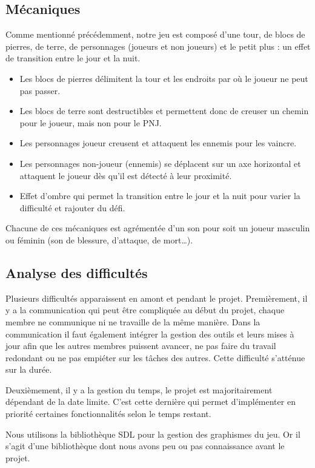 \documentclass[a4paper,12pt]{article}
\begin{document}
\subsection{Mécaniques}
Comme mentionné précédemment, notre jeu est composé d'une tour, de blocs de pierres, de terre, de personnages (joueurs et non joueurs) et le petit plus : un effet de transition entre le jour et la nuit.
\begin{itemize}
	\item Les blocs de pierres délimitent la tour et les endroits par où le joueur ne peut pas passer.
	\item Les blocs de terre sont destructibles et permettent donc de creuser un chemin pour le joueur, mais non pour le PNJ.
	\item Les personnages joueur creusent et attaquent les ennemis pour les vaincre.
	\item Les personnages non-joueur (ennemis) se déplacent sur un axe horizontal et attaquent le joueur dès qu'il est détecté à leur proximité.
	\item Effet d'ombre qui permet la transition entre le jour et la nuit pour varier la difficulté et rajouter du défi.
\end{itemize}

Chacune de ces mécaniques est agrémentée d'un son pour soit un joueur masculin ou féminin (son de blessure, d'attaque, de mort\dots).


\subsection{Analyse des difficultés}
Plusieurs difficultés apparaissent en amont et pendant le projet. 
Premièrement, il y a la communication qui peut être compliquée au début du projet, chaque membre ne communique ni ne travaille de la même manière. Dans la communication il faut également intégrer la gestion des outils et leurs mises à jour afin que les autres membres puissent avancer, ne pas faire du travail redondant ou ne pas empiéter sur les tâches des autres. Cette difficulté s'atténue sur la durée.

Deuxièmement, il y a la gestion du temps, le projet est majoritairement dépendant de la date limite. C’est cette dernière qui permet d’implémenter en priorité certaines fonctionnalités selon le temps restant.

Nous utilisons la bibliothèque SDL pour la gestion des graphismes du jeu. Or il s’agit d’une bibliothèque dont nous avons peu ou pas connaissance avant le projet.
\end{document}

